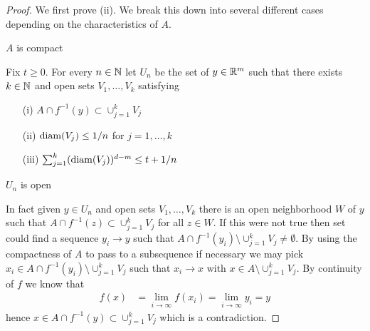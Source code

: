 \begin{proof}
We first prove (ii).  We break this down into several different cases depending on the characteristics of $A$.
\begin{cas} $A$ is compact
\end{cas}
Fix $t \geq 0$.  For every $n \in \mathbb{N}$ let $U_n$ be the set of $y \in \mathbb{R}^m$ such that there exists $k \in \mathbb{N}$ and open sets 
$V_1, \dotsc, V_k$ satisfying
\begin{itemize}
\item[(i)] $A \cap f^{-1}(y) \subset \cup_{j=1}^k V_j$
\item[(ii)] $\operatorname*{diam}(V_j) \leq 1/n$ for $j=1, \dotsc, k$
\item[(iii)] $\sum_{j=1}^k (\operatorname*{diam}(V_j))^{d-m} \leq t + 1/n$
\end{itemize}
\begin{clm}$U_n$ is open 
\end{clm}
In fact given $y \in U_n$ and open sets $V_1, \dotsc, V_k$ there is an open neighborhood $W$ of $y$
such that $A \cap f^{-1}(z) \subset \cup_{j=1}^k V_j$ for all $z \in W$.  If this were not true then set could find a sequence $y_i \to y$ such
that $A \cap f^{-1}(y_i) \setminus \cup_{j=1}^k V_j \neq \emptyset$.  By using the compactness of $A$ to pass to a subsequence if necessary
we may pick $x_i \in A \cap f^{-1}(y_i) \setminus \cup_{j=1}^k V_j$ such that $x_i \to x$ with $x \in A \setminus \cup_{j=1}^k V_j$.  By continuity of $f$
we know that 
\begin{align*}
f(x) &= \lim_{i \to \infty} f(x_i) = \lim_{i \to \infty} y_i = y
\end{align*}
hence $x \in A \cap f^{-1}(y) \subset \cup_{j=1}^k V_j$ which is a contradiction.


\end{proof}
